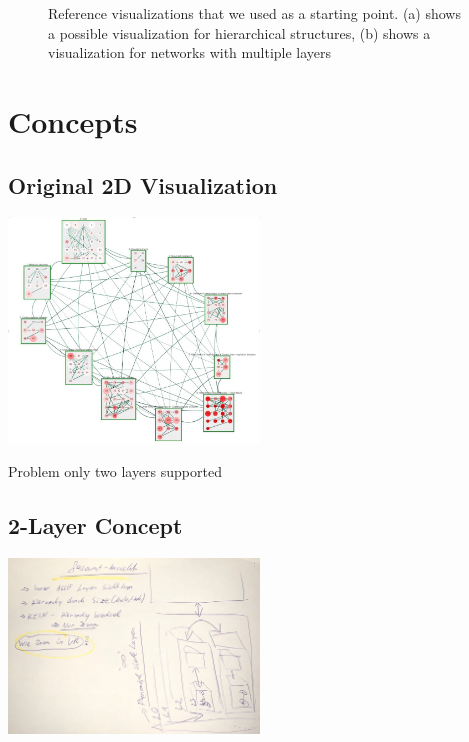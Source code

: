 \begin{figure}[h]
\begin{subfigure}[b]{0.50\columnwidth}
      \label{fig:2dmultilayerVis}
    \end{subfigure}
    \caption[Optional caption for the figure list (often used to abbreviate long captions)]{Reference visualizations that we used as a starting point. (a) shows a possible visualization for hierarchical structures, (b) shows a visualization for networks with multiple layers} %
    \label{fig:referenceVisualizations} 
  \end{figure}

\section{Concepts}
\subsection{Original 2D Visualization}
\includegraphics[width=0.5\textwidth]{chapters/graphics/2dVisOfDemoData.jpg}

Problem only two layers supported

\subsection{2-Layer Concept}
\includegraphics[width=0.5\textwidth]{chapters/graphics/concept2.jpg}

